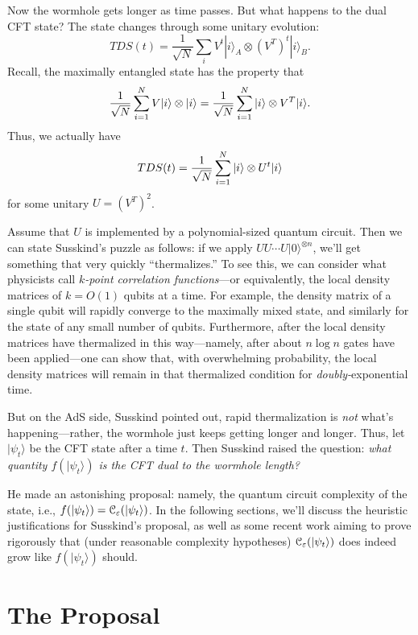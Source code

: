 \documentclass[12pt]{report}
\theoremstyle{plain}
\theoremstyle{definition}
\newcommand{\eps}{\varepsilon}
\renewcommand{\ket}[1]{|#1\rangle}
\begin{document}
Now the wormhole gets longer as time passes.  But what happens to the dual CFT state?  The state changes through some unitary evolution:
$$ TDS(t) = \frac{1}{\sqrt{N}}  \sum_i V^t \ket{i}_A \otimes  (V^T)^t \ket{i}_B. $$
Recall, the maximally entangled state has the property that
$$ \frac{1}{\sqrt{N}} \sum_{i=1}^N V \ket{i} \otimes \ket{i} = {1 \over \sqrt{N}} \sum_{i=1}^N \ket{i} \otimes V^T \ket{i}. $$
Thus, we actually have
$$ TDS(t) = {1 \over \sqrt{N}} \sum_{i=1}^N \ket{i} \otimes U^t \ket{i} $$
for some unitary $U = (V^T)^2$.

Assume that $U$ is implemented by a polynomial-sized quantum circuit.  Then we can state Susskind's puzzle as follows: if we apply $U U \cdots U \ket{0}^{\otimes n}$, we'll get something that very quickly ``thermalizes.''  To see this, we can consider what physicists call {\em $k$-point correlation functions}---or equivalently, the local density matrices of $k=O(1)$ qubits at a time.   For example, the density matrix of a single qubit will rapidly converge to the maximally mixed state, and similarly for the state of any small number of qubits.  Furthermore, after the local density matrices have thermalized in this way---namely, after about $n \log n$ gates have been applied---one can show that, with overwhelming probability, the local density matrices will remain in that thermalized condition for {\em doubly-}exponential time.

But on the AdS side, Susskind pointed out, rapid thermalization is {\it not} what's happening---rather, the wormhole just keeps getting longer and longer. Thus, let $\ket{\psi_t}$ be the CFT state after a time $t$.  Then Susskind raised the question: {\em what quantity $f(\ket{\psi_t})$ is the CFT dual to the wormhole length?}

He made an astonishing proposal: namely, the quantum circuit complexity of the state, i.e., $f(\ket{\psi_t}) = {\cal C}_{\eps} (\ket{\psi_t})$.  In the following sections, we'll discuss the heuristic justifications for Susskind's proposal, as well as some recent work aiming to prove rigorously that (under reasonable complexity hypotheses) ${\cal C}_{\eps} (\ket{\psi_t})$ does indeed grow like $f(\ket{\psi_t})$ should.

\section{The Proposal}
\end{document}
